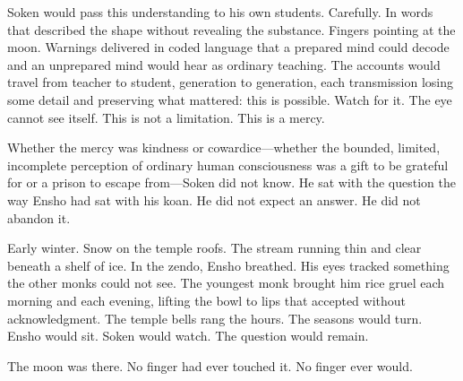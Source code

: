 Soken would pass this understanding to his own students. Carefully. In words that described the shape without revealing the substance. Fingers pointing at the moon. Warnings delivered in coded language that a prepared mind could decode and an unprepared mind would hear as ordinary teaching. The accounts would travel from teacher to student, generation to generation, each transmission losing some detail and preserving what mattered: this is possible. Watch for it. The eye cannot see itself. This is not a limitation. This is a mercy.

Whether the mercy was kindness or cowardice---whether the bounded, limited, incomplete perception of ordinary human consciousness was a gift to be grateful for or a prison to escape from---Soken did not know. He sat with the question the way Ensho had sat with his koan. He did not expect an answer. He did not abandon it.

Early winter. Snow on the temple roofs. The stream running thin and clear beneath a shelf of ice. In the zendo, Ensho breathed. His eyes tracked something the other monks could not see. The youngest monk brought him rice gruel each morning and each evening, lifting the bowl to lips that accepted without acknowledgment. The temple bells rang the hours. The seasons would turn. Ensho would sit. Soken would watch. The question would remain.

The moon was there. No finger had ever touched it. No finger ever would.
